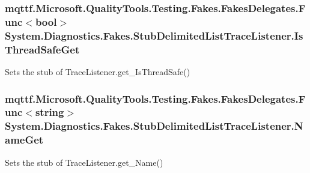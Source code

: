 \hypertarget{class_system_1_1_diagnostics_1_1_fakes_1_1_stub_delimited_list_trace_listener_a3230302952a50d25ad9b228f656fb81c}{
\subsubsection[{Is\-Thread\-Safe\-Get}]{\setlength{\rightskip}{0pt plus 5cm}mqttf.\-Microsoft.\-Quality\-Tools.\-Testing.\-Fakes.\-Fakes\-Delegates.\-Func$<$bool$>$ System.\-Diagnostics.\-Fakes.\-Stub\-Delimited\-List\-Trace\-Listener.\-Is\-Thread\-Safe\-Get}}\label{class_system_1_1_diagnostics_1_1_fakes_1_1_stub_delimited_list_trace_listener_a3230302952a50d25ad9b228f656fb81c}


Sets the stub of Trace\-Listener.\-get\-\_\-\-Is\-Thread\-Safe()

\hypertarget{class_system_1_1_diagnostics_1_1_fakes_1_1_stub_delimited_list_trace_listener_aee9f67064ec105a4d5b55c1b84b11ffc}{
\subsubsection[{Name\-Get}]{\setlength{\rightskip}{0pt plus 5cm}mqttf.\-Microsoft.\-Quality\-Tools.\-Testing.\-Fakes.\-Fakes\-Delegates.\-Func$<$string$>$ System.\-Diagnostics.\-Fakes.\-Stub\-Delimited\-List\-Trace\-Listener.\-Name\-Get}}\label{class_system_1_1_diagnostics_1_1_fakes_1_1_stub_delimited_list_trace_listener_aee9f67064ec105a4d5b55c1b84b11ffc}


Sets the stub of Trace\-Listener.\-get\-\_\-\-Name()

